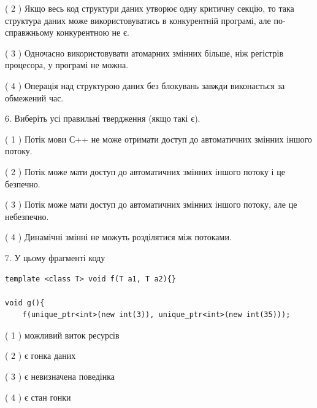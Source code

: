 \documentclass[12pt, ukrainian]{article}
\begin{document}
\begin {large}
{( 2 ) Якщо весь код структури даних утворює одну критичну секцію, то така структура даних може використовуватись в конкурентній програмі, але по-справжньо\-му конкурентною не є.%

( 3 ) Одночасно використовувати атомарних змінних більше, ніж регістрів процесора, у програмі не можна.%

( 4 ) Операція над структурою даних без блокувань завжди виконається за обмежений час.%
\newpage



\vspace{5mm}
6. Виберіть усі правильні твердження (якщо такі є).\par
\vspace{2mm}

( 1 ) Потік мови С++ не може отримати доступ до автоматичних змінних іншого потоку.%

( 2 ) Потік може мати доступ до автоматичних змінних іншого потоку і це безпечно.%

( 3 ) Потік може мати доступ до автоматичних змінних іншого потоку, але це небезпечно.%

( 4 ) Динамічні змінні не можуть розділятися між потоками.%


\vspace{5mm}
7. У цьому фрагменті коду
\begin{verbatim}
template <class T> void f(T a1, T a2){}

void g(){
    f(unique_ptr<int>(new int(3)), unique_ptr<int>(new int(35)));
\end{verbatim}

( 1 ) можливий виток ресурсів%

( 2 ) є гонка даних%

( 3 ) є невизначена поведінка%

( 4 ) є стан гонки%
}
\end {large}
\end{document}
